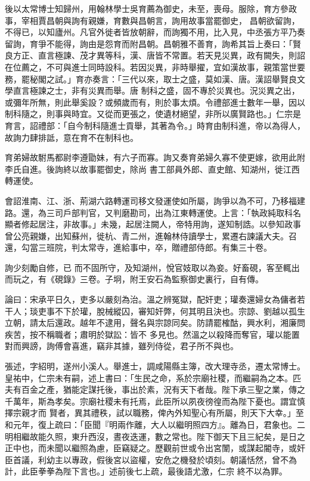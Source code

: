 \begin{pinyinscope}
 後以太常博士知歸州，用翰林學士吳育薦為御史，未至，喪母。服除，育方參政事，宰相賈昌朝與詢有親嫌，育數與昌朝言，詢用故事當罷御史，
 昌朝欲留詢，不得已，以知廬州。凡官外徙者皆放朝辭，而詢獨不用，比入見，中丞張方平乃奏留詢，育爭不能得，詢由是怨育而附昌朝。昌朝雅不善育，詢希其旨上奏曰：「賢良方正、直言極諫、茂才異等科，漢、唐皆不常置。若天見災異，政有闕失，則詔在位薦之，不可與進士同時設科。若因災異，非時舉擢，宜如漢故事，親策當世要務，罷秘閣之試。」育亦奏言：「三代以來，取士之盛，莫如漢、唐。漢詔舉賢良文學直言極諫之士，非有災異而舉。唐
 制科之盛，固不專於災異也。況災異之出，或彌年所無，則此舉奚設？或頻歲而有，則於事太煩。令禮部進士數年一舉，因以制科隨之，則事與時宜。又從而更張之，使遺材絕望，非所以廣賢路也。」仁宗是育言，詔禮部：「自今制科隨進士貢舉，其著為令。」時育由制科進，帝以為得人，故詢力肆排詆，意在育不在制科也。



 育弟婦故駙馬都尉李遵勖妹，有六子而寡。詢又奏育弟婦久寡不使更嫁，欲用此附李氏自進。後詢終以故事罷御史，除尚
 書工部員外郎、直史館、知湖州，徙江西轉運使。



 會詔淮南、江、浙、荊湖六路轉運司移文發運使如所屬，詢爭以為不可，乃移福建路。還，為三司戶部判官，又判磨勘司，出為江東轉運使。上言：「執政純取科名顯者修起居注，非故事。」未幾，起居注闕人，帝特用詢，遂知制誥。以參知政事曾公亮親嫌，出知蘇州，徙杭、青二州，進翰林侍讀學士，累遷右諫議大夫。召還，勾當三班院，判太常寺，進給事中，卒，贈禮部侍郎。有集三十卷。



 詢少刻勵自修，已
 而不固所守，及知湖州，悅官妓取以為妾。好畜硯，客至輒出而玩之，有《硯錄》三卷。子坰，附王安石為監察御史裏行，自有傳。



 論曰：宋承平日久，吏多以嚴刻為治。溫之辨冤獄，配奸吏；瓘奏還婦女為傭者若干人；琰吏事不下於瓘，脫械縱囚，審知奸弊，何其明且決也。宗諒、劉越以孤生立朝，請太后還政。越年不逮用，聲名與宗諒同矣。防請罷榷酤，興水利，湘廉問疾苦，按不稱職者；肅明於獄訟：皆不
 多見也。然溫之以殺降而奪官，瓘以能置對而興謗，詢傅會喜進，竊非其據，雖列侍從，君子所不與也。



 張述，字紹明，遂州小溪人。舉進士，調咸陽縣主簿，改大理寺丞，遷太常博士。皇祐中，仁宗未有嗣，述上書曰：「生民之命，系於宗廟社稷，而繼嗣為之本。匹夫有百金之產，猶能定謀托後，事出於素，況有天下者哉。陛下承三聖之業，傳之千萬年，斯為孝矣。宗廟社稷未有托焉，此臣所以夙夜徬徨而為陛下憂也。謂宜慎擇宗親才而
 賢者，異其禮秩，試以職務，俾內外知聖心有所屬，則天下大幸。」至和元年，復上疏曰：「臣聞『明兩作離，大人以繼明照四方』。離為日，君象也。二明相繼故能久照，東升西沒，晝夜迭運，數之常也。陛下御天下且三紀矣，是日之正中也，而未聞以繼照為慮，臣竊疑之。歷觀前世或令出宮闈，或謀起閽寺，或奸臣首議，利幼主以專政，假後宮以盜權，安危之機發於頃刻。朝議恬然，曾不為計，此臣拳拳為陛下言也。」述前後七上疏，最後語尤激，仁宗
 終不以為罪。




\end{pinyinscope}
